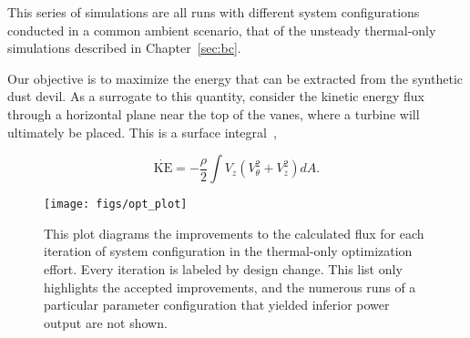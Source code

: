 This series of simulations are all runs with different system
configurations conducted in a common ambient scenario, that of the
unsteady thermal-only simulations described in Chapter~\ref{sec:bc}. 

Our objective is to maximize the energy that can be 
extracted from the synthetic dust devil. As a surrogate to this
quantity, consider the kinetic energy flux through a horizontal plane
near the top of the vanes, where a turbine will ultimately be
placed. This is a surface integral~\cite{landau1959fm},

%
%
%



 \begin{equation}
  \dot{ \text{KE}} = -\frac{\rho }{2} \int V_z (V_{\theta}^2 + V_z^2 ) dA.
 \end{equation}

\begin{figure}[htb]
 \centering
 \texttt{[image: figs/opt\_plot]}
 \caption{This plot diagrams the improvements to the calculated flux for  
 each iteration of system configuration in the thermal-only optimization
 effort. Every iteration is labeled by design change. This list
 only highlights the accepted improvements, and the numerous runs of a
 particular parameter configuration that yielded inferior power output
 are not shown. }
 \label{fig:opt_plot}
\end{figure}






